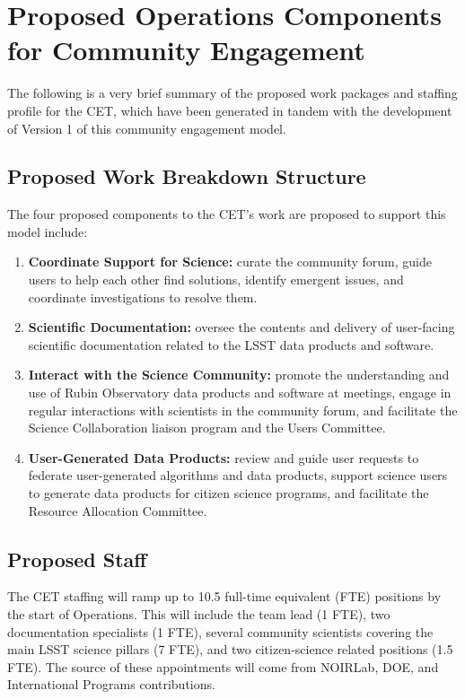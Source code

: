 \documentclass[DM,lsstdraft,toc]{lsstdoc}
\begin{document}
\section{Proposed Operations Components for Community Engagement}

The following is a very brief summary of the proposed work packages and staffing profile for the CET, which have been generated in tandem with the development of Version 1 of this community engagement model.


\subsection{Proposed Work Breakdown Structure}

The four proposed components to the CET's work are proposed to support this model include:
\begin{enumerate}
\item \textbf{Coordinate Support for Science:} curate the community forum, guide users to help each other find solutions, identify emergent issues, and coordinate investigations to resolve them.
\item \textbf{Scientific Documentation:} oversee the contents and delivery of user-facing scientific documentation related to the LSST data products and software. 
\item \textbf{Interact with the Science Community:} promote the understanding and use of Rubin Observatory data products and software at meetings, engage in regular interactions with scientists in the community forum, and facilitate the Science Collaboration liaison program and the Users Committee.
\item \textbf{User-Generated Data Products:} review and guide user requests to federate user-generated algorithms and data products, support science users to generate data products for citizen science programs, and facilitate the Resource Allocation Committee.
\end{enumerate}


\subsection{Proposed Staff}

The CET staffing will ramp up to 10.5 full-time equivalent (FTE) positions by the start of Operations.
This will include the team lead (1 FTE), two documentation specialists (1 FTE), several community scientists covering the main LSST science pillars (7 FTE), and two citizen-science related positions (1.5 FTE). 
The source of these appointments will come from NOIRLab, DOE, and International Programs contributions.
\end{document}
